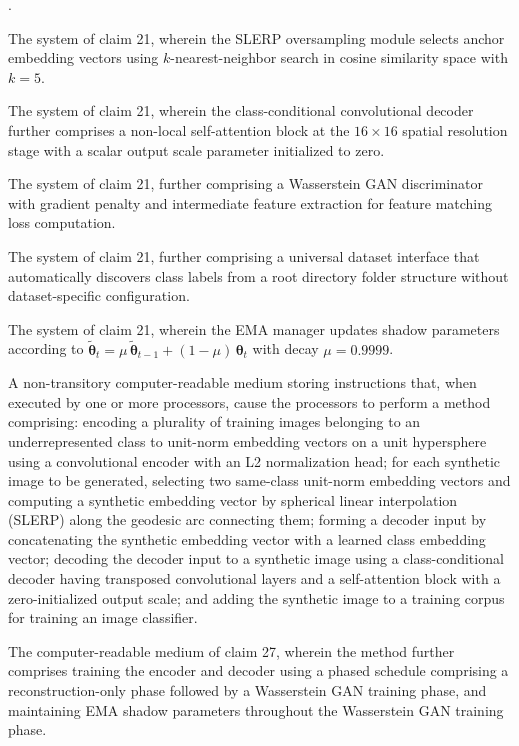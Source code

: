 \documentclass[12pt,letterpaper]{article}
\newcommand{\btheta}{\bm{\theta}}
\newcounter{claimnum}
\newenvironment{claims}{%
  \setcounter{claimnum}{0}
  \begin{list}{\arabic{claimnum}.}{%
    \usecounter{claimnum}
    \setlength{\leftmargin}{2em}
    \setlength{\labelsep}{0.5em}
    \setlength{\itemsep}{0pt}
    \setlength{\parsep}{6pt plus 2pt}
  }%
}{\end{list}}
\begin{document}
\begin{claims}
\item The system of claim 21, wherein the SLERP oversampling module selects
anchor embedding vectors using $k$-nearest-neighbor search in cosine similarity
space with $k = 5$.

\item The system of claim 21, wherein the class-conditional convolutional
decoder further comprises a non-local self-attention block at the
$16 \times 16$ spatial resolution stage with a scalar output scale parameter
initialized to zero.

\item The system of claim 21, further comprising a Wasserstein GAN discriminator
with gradient penalty and intermediate feature extraction for feature matching
loss computation.

\item The system of claim 21, further comprising a universal dataset interface
that automatically discovers class labels from a root directory folder structure
without dataset-specific configuration.

\item The system of claim 21, wherein the EMA manager updates shadow parameters
according to $\tilde{\btheta}_t = \mu\,\tilde{\btheta}_{t-1} + (1-\mu)\,\btheta_t$
with decay $\mu = 0.9999$.

\item A non-transitory computer-readable medium storing instructions that,
when executed by one or more processors, cause the processors to perform a
method comprising:
encoding a plurality of training images belonging to an underrepresented class
to unit-norm embedding vectors on a unit hypersphere using a convolutional
encoder with an L2 normalization head;
for each synthetic image to be generated, selecting two same-class unit-norm
embedding vectors and computing a synthetic embedding vector by spherical
linear interpolation (SLERP) along the geodesic arc connecting them;
forming a decoder input by concatenating the synthetic embedding vector with a
learned class embedding vector;
decoding the decoder input to a synthetic image using a class-conditional
decoder having transposed convolutional layers and a self-attention block with
a zero-initialized output scale; and
adding the synthetic image to a training corpus for training an image
classifier.

\item The computer-readable medium of claim 27, wherein the method further
comprises training the encoder and decoder using a phased schedule comprising
a reconstruction-only phase followed by a Wasserstein GAN training phase, and
maintaining EMA shadow parameters throughout the Wasserstein GAN training
phase.


\end{claims}
\end{document}
